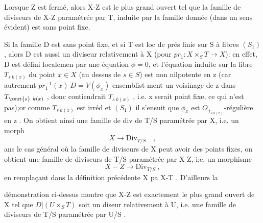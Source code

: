 
 Lorsque Z est fermé, alors X-Z est le plus grand ouvert
tel que la famille de diviseurs de X-Z paramétrée par T, induite par la
famille donnée (dans un sens évident) est sans point fixe.

Si la famille D est sans point fixe, et si T est  loc de prés finie
sur S à fibres $(S_1)$, alors D est aussi un diviseur 
relativement à X (pour $pr_1 : X\times_S T \longrightarrow X$): en effet, D est défini localemen
 par une équation  $\phi = 0$, et l'équation induite sur la fibre
$T_{s\ k(x)}$ du point $x\in X$ (au dessus de $s\in S$) est non 
nilpotente en z (car autrement $pr_1^{-1}(x)\ D = V(\phi_x)$   ensemblist
ment un voisinage de z dans $T_{\xout{s}\ k(x)}$ , donc contiendrait $T_{s\ k(x)}$ , i.e.
x serait point fixe, ce qui n'est pas);or comme $T_{s\ k(x)}$ est irréd et $(S_1)$
il s'ensuit que $\phi_x$ est $\underline{O}_{T_{s\ k(x)}}$-régulière en z . On obtient ainsi
 une famille de div de T/S paramétrée par X, i.e. un morph
\[ X \longrightarrow \mathrm{Div}_{T/S} \quad , \]
ans le cas général où la famille de diviseurs de X peut avoir des points
fixes, on obtient une famille de diviseurs de T/S paramétrée par X-Z,
i;e. un morphisme
\[ X - Z \longrightarrow \mathrm{Div}_{T/S} \ , \]
en remplaçant dans la définition précédente X pa X-T . D'ailleurs la

 
 démonstration ci-dessus montre que X-Z est exactement
le plus grand ouvert  de X tel que $D|(U\times_S T)$ soit un diseur 
relativement à U, i.e.   une famille de diviseurs de T/S paramétrée
par U/S .

